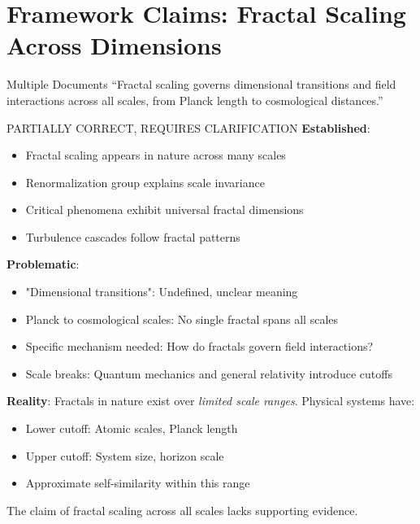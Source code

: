 \section{Framework Claims: Fractal Scaling Across Dimensions}

\begin{frameworkclaim}{Multiple Documents}
``Fractal scaling governs dimensional transitions and field interactions across all scales, from Planck length to cosmological distances.''
\end{frameworkclaim}

\begin{factcheck}{PARTIALLY CORRECT, REQUIRES CLARIFICATION}
\textbf{Established}:
\begin{itemize}
    \item[+] Fractal scaling appears in nature across many scales
    \item[+] Renormalization group explains scale invariance
    \item[+] Critical phenomena exhibit universal fractal dimensions
    \item[+] Turbulence cascades follow fractal patterns
\end{itemize}

\textbf{Problematic}:
\begin{itemize}
    \item[$?$] "Dimensional transitions": Undefined, unclear meaning
    \item[$?$] Planck to cosmological scales: No single fractal spans all scales
    \item[$?$] Specific mechanism needed: How do fractals govern field interactions?
    \item[$-$] Scale breaks: Quantum mechanics and general relativity introduce cutoffs
\end{itemize}

\textbf{Reality}: Fractals in nature exist over \textit{limited scale ranges}. Physical systems have:
\begin{itemize}
    \item Lower cutoff: Atomic scales, Planck length
    \item Upper cutoff: System size, horizon scale
    \item Approximate self-similarity within this range
\end{itemize}

The claim of fractal scaling across all scales lacks supporting evidence.
\end{factcheck}

